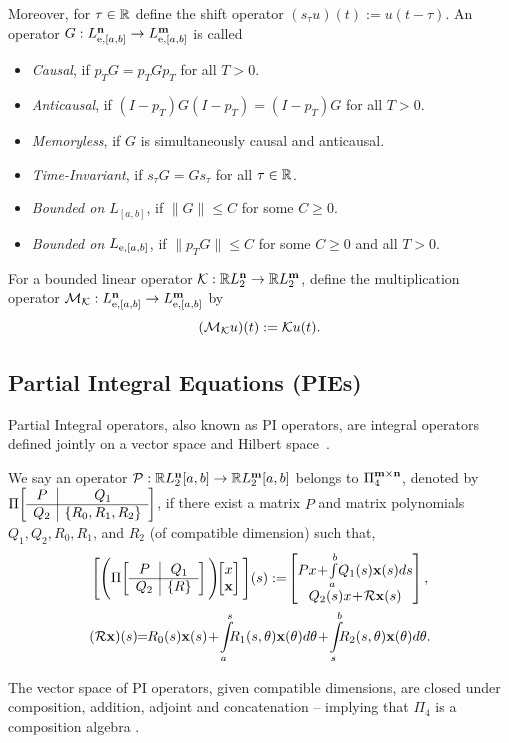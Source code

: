 Moreover, for $\tau \in \mathbb{R}$ define the shift operator $(s_\tau u)(t):=u(t-\tau)$. An 
operator $G:L_{{\mathrm{e}},[a,b]}^{\mathbf{n}}\to
L_{{\mathrm{e}},[a,b]}^{\mathbf{m}}$ is called
\begin{itemize}
\item \emph{Causal}, if $p_TG=p_TGp_T$ for all $T>0$.
\item \emph{Anticausal}, if $(I-p_T)G(I-p_T)=(I-p_T)G$ for all $T>0$.
\item \emph{Memoryless}, if $G$ is simultaneously causal and anticausal.
\item \emph{Time-Invariant}, if $s_\tau G = G s_\tau$ for all $\tau\in\mathbb{R}$.
\item \emph{Bounded on $L_{[a,b]}$}, if $\|G\|\leq C$ for some $C\geq0$.
\item \emph{Bounded on $L_{{\mathrm{e}},[a,b]}$}, if
$\|p_TG\|\leq C$ for some $C\geq0$ and all $T>0$.
\end{itemize}
For a bounded linear operator
$\mathcal{K}:\mathbb{R} L_2^{\mathbf{n}}\to\mathbb{R} L_2^{\mathbf{m}}$, define the multiplication operator
$\mathcal{M}_{\mathcal{K}}:L_{{\mathrm{e}},[a,b]}^{\mathbf{n}}
\to L_{{\mathrm{e}},[a,b]}^{\mathbf{m}}$ by
\[
(\mathcal{M}_{\mathcal{K}}u)(t):=\mathcal{K} u(t).
\]

\subsection{Partial Integral Equations (PIEs)}
Partial Integral operators, also known as PI operators, are integral operators
defined jointly on a vector space and Hilbert
space~\cite{peet2021pierepresentation,shivakumar2024GDPE}.
\begin{definition}
We say an operator $\mathcal{P}:\mathbb{R} L_2^{\mathbf{n}}[a,b]\to\mathbb{R} L_2^{\mathbf{m}}[a,b]$
belongs to ${\Pi}_4^{\mathbf{m}\times\mathbf{n}}$, denoted by
$\Pi\!\left[ \begin{array}{c|c} P & Q_1\\ \hline Q_2 & \{R_0,R_1,R_2\} \end{array} \right]$, if there exist a matrix $P$ and matrix polynomials $Q_1, Q_2,
R_0, R_1$, and $R_2$ (of compatible dimension) such that,
\begin{gather*}
\Bigg[\Bigg(\PIop{P}{Q_1}{Q_2}{\{R\}}\Bigg)\! \!
\bmat{x \\ \mbf{x}}\Bigg](s):=\! \bmat{Px\!
+\!\int\limits_a^b\!Q_1(s)\mbf x(s)ds\\Q_2(s)x\!+\!\mcl R \mbf x(s)},\\ 
(\mcl R \mbf x)(s)\!\! =\!\! R_0(s)\mbf x(s)\! +\! \int\limits_a^s\!\!\!R_1(s,\theta)\mbf x(\theta)d\theta\! +\!\int\limits_s^b\!\!\!R_2(s,\theta)\mbf x(\theta) d\theta.
\end{gather*}
\end{definition}
The vector space of PI operators, given compatible dimensions, are closed under
composition, addition, adjoint and concatenation -- implying that ${\Pi}_4$ is a
composition algebra \cite{shivakumar2024GDPE}.


